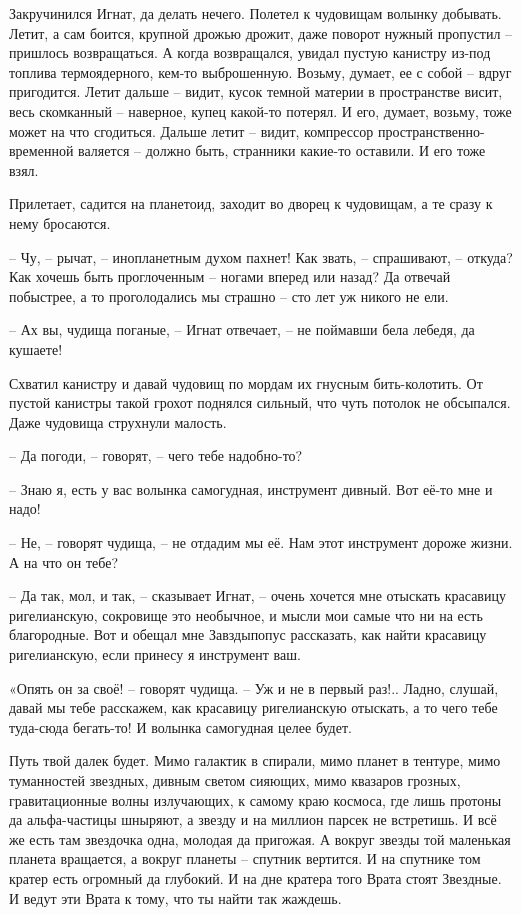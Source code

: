 \documentclass[ebook,oneside,final,openright]{memoir}
\begin{document}
\par
Закручинился Игнат, да делать нечего. Полетел к чудовищам волынку добывать. Летит, а сам боится, крупной дрожью дрожит, даже поворот нужный пропустил – пришлось возвращаться. А когда возвращался, увидал пустую канистру из-под топлива термоядерного, кем-то выброшенную. Возьму, думает, ее с собой – вдруг пригодится. Летит дальше – видит, кусок темной материи в пространстве висит, весь скомканный – наверное, купец какой-то потерял. И его, думает, возьму, тоже может на что сгодиться. Дальше летит – видит, компрессор пространственно-временной валяется – должно быть, странники какие-то оставили. И его тоже взял.\par
\par
Прилетает, садится на планетоид, заходит во дворец к чудовищам, а те сразу к нему бросаются. \par
– Чу, – рычат, – инопланетным духом пахнет! Как звать, – спрашивают, – откуда? Как хочешь быть проглоченным – ногами вперед или назад? Да отвечай побыстрее, а то проголодались мы страшно – сто лет уж никого не ели.\par
– Ах вы, чудища поганые, – Игнат отвечает, – не поймавши бела лебедя, да кушаете! \par
Схватил канистру и давай чудовищ по мордам их гнусным бить-колотить. От пустой канистры такой грохот поднялся сильный, что чуть потолок не обсыпался. Даже чудовища струхнули малость. \par
– Да погоди, – говорят, – чего тебе надобно-то?\par
– Знаю я, есть у вас волынка самогудная, инструмент дивный. Вот её-то мне и надо!\par
– Не, – говорят чудища, – не отдадим мы её. Нам этот инструмент дороже жизни. А на что он тебе? \par
– Да так, мол, и так, – сказывает Игнат, – очень хочется мне отыскать красавицу ригелианскую, сокровище это необычное, и мысли мои самые что ни на есть благородные. Вот и обещал мне Завздыпопус рассказать, как найти красавицу ригелианскую, если принесу я инструмент ваш. \par
\par
«Опять он за своё! – говорят чудища. – Уж и не в первый раз!.. Ладно, слушай, давай мы тебе расскажем, как красавицу ригелианскую отыскать, а то чего тебе туда-сюда бегать-то! И волынка самогудная целее будет. \par
\par
Путь твой далек будет. Мимо галактик в спирали, мимо планет в тентуре, мимо туманностей звездных, дивным светом сияющих, мимо квазаров грозных, гравитационные волны излучающих, к самому краю космоса, где лишь протоны да альфа-частицы шныряют, а звезду и на миллион парсек не встретишь. И всё же есть там звездочка одна, молодая да пригожая. А вокруг звезды той маленькая планета вращается, а вокруг планеты – спутник вертится. И на спутнике том кратер есть огромный да глубокий. И на дне кратера того Врата стоят Звездные. И ведут эти Врата к тому, что ты найти так жаждешь.\par
\end{document}
